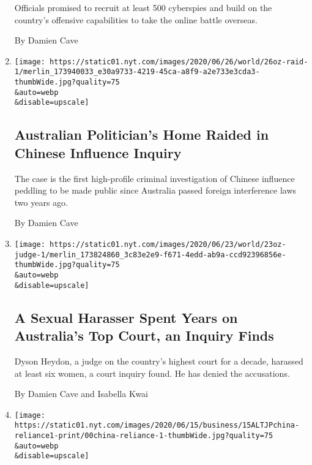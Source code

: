\begin{enumerate}
  Officials promised to recruit at least 500 cyberspies and build on the
  country's offensive capabilities to take the online battle overseas.

  By Damien Cave
\item
  \href{/2020/06/26/world/australia/politician-home-raid-china-influence.html}{}

  \texttt{[image: https://static01.nyt.com/images/2020/06/26/world/26oz-raid-1/merlin\_173940033\_e30a9733-4219-45ca-a8f9-a2e733e3cda3-thumbWide.jpg?quality=75\\\&auto=webp\\\&disable=upscale]}

  \hypertarget{australian-politicians-home-raided-in-chinese-influence-inquiry}{%
  \subsection{Australian Politician's Home Raided in Chinese Influence
  Inquiry}\label{australian-politicians-home-raided-in-chinese-influence-inquiry}}

  The case is the first high-profile criminal investigation of Chinese
  influence peddling to be made public since Australia passed foreign
  interference laws two years ago.

  By Damien Cave
\item
  \href{/2020/06/23/world/australia/dyson-heydon-high-court-metoo.html}{}

  \texttt{[image: https://static01.nyt.com/images/2020/06/23/world/23oz-judge-1/merlin\_173824860\_3c83e2e9-f671-4edd-ab9a-ccd92396856e-thumbWide.jpg?quality=75\\\&auto=webp\\\&disable=upscale]}

  \hypertarget{a-sexual-harasser-spent-years-on-australias-top-court-an-inquiry-finds}{%
  \subsection{A Sexual Harasser Spent Years on Australia's Top Court, an
  Inquiry
  Finds}\label{a-sexual-harasser-spent-years-on-australias-top-court-an-inquiry-finds}}

  Dyson Heydon, a judge on the country's highest court for a decade,
  harassed at least six women, a court inquiry found. He has denied the
  accusations.

  By Damien Cave and Isabella Kwai
\item
  \href{/2020/06/15/business/china-decoupling.html}{}

  \texttt{[image: https://static01.nyt.com/images/2020/06/15/business/15ALTJPchina-reliance1-print/00china-reliance-1-thumbWide.jpg?quality=75\\\&auto=webp\\\&disable=upscale]}


\end{enumerate}
